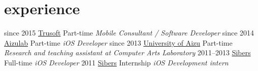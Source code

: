 \documentclass[]{friggeri-cv}
\begin{document}
\section{experience}

\begin{entrylist}
  \entry
    {since 2015}
    {\href{http://www.trusoft.com/}{Trusoft}}
    {Part-time}
    {\emph{Mobile Consultant / Software Developer}}
  \entry
    {since 2014}
    {\href{http://www.aizulab.com/}{Aizulab}}
    {Part-time}
    {\emph{iOS Developer}}
  \entry
    {since 2013}
    {\href{www.u-aizu.ac.jp/}{University of Aizu}}
    {Part-time}
    {\emph{Research and teaching assistant at Computer Arts Laboratory}}
  \entry
    {2011–2013}
    {\href{http://www.sibers.com/}{Sibers}}
    {Full-time}
    {\emph{iOS Developer}}
  \entry
    {2011}
    {\href{http://www.sibers.com/}{Sibers}}
    {Internship}
    {\emph{iOS Development intern}}
\end{entrylist}
\end{document}
